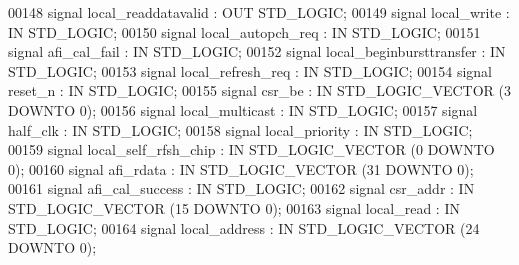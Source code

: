 \begin{DoxyCode}
00148         \textcolor{keywordflow}{signal} local\_readdatavalid : \textcolor{keywordflow}{OUT} \textcolor{comment}{STD\_LOGIC};
00149         \textcolor{keywordflow}{signal} local\_write : \textcolor{keywordflow}{IN} \textcolor{comment}{STD\_LOGIC};
00150         \textcolor{keywordflow}{signal} local\_autopch\_req : \textcolor{keywordflow}{IN} \textcolor{comment}{STD\_LOGIC};
00151         \textcolor{keywordflow}{signal} afi\_cal\_fail : \textcolor{keywordflow}{IN} \textcolor{comment}{STD\_LOGIC};
00152         \textcolor{keywordflow}{signal} local\_beginbursttransfer : \textcolor{keywordflow}{IN} \textcolor{comment}{STD\_LOGIC};
00153         \textcolor{keywordflow}{signal} local\_refresh\_req : \textcolor{keywordflow}{IN} \textcolor{comment}{STD\_LOGIC};
00154         \textcolor{keywordflow}{signal} reset\_n : \textcolor{keywordflow}{IN} \textcolor{comment}{STD\_LOGIC};
00155         \textcolor{keywordflow}{signal} csr\_be : \textcolor{keywordflow}{IN} \textcolor{comment}{STD\_LOGIC\_VECTOR} (\textcolor{vhdllogic}{}\textcolor{vhdllogic}{3} \textcolor{keywordflow}{DOWNTO} \textcolor{vhdllogic}{}\textcolor{vhdllogic}{0});
00156         \textcolor{keywordflow}{signal} local\_multicast : \textcolor{keywordflow}{IN} \textcolor{comment}{STD\_LOGIC};
00157         \textcolor{keywordflow}{signal} half\_clk : \textcolor{keywordflow}{IN} \textcolor{comment}{STD\_LOGIC};
00158         \textcolor{keywordflow}{signal} local\_priority : \textcolor{keywordflow}{IN} \textcolor{comment}{STD\_LOGIC};
00159         \textcolor{keywordflow}{signal} local\_self\_rfsh\_chip : \textcolor{keywordflow}{IN} \textcolor{comment}{STD\_LOGIC\_VECTOR} (\textcolor{vhdllogic}{}\textcolor{vhdllogic}{0} \textcolor{keywordflow}{DOWNTO} \textcolor{vhdllogic}{}\textcolor{vhdllogic}{0});
00160         \textcolor{keywordflow}{signal} afi\_rdata : \textcolor{keywordflow}{IN} \textcolor{comment}{STD\_LOGIC\_VECTOR} (\textcolor{vhdllogic}{}\textcolor{vhdllogic}{31} \textcolor{keywordflow}{DOWNTO} \textcolor{vhdllogic}{}\textcolor{vhdllogic}{0});
00161         \textcolor{keywordflow}{signal} afi\_cal\_success : \textcolor{keywordflow}{IN} \textcolor{comment}{STD\_LOGIC};
00162         \textcolor{keywordflow}{signal} csr\_addr : \textcolor{keywordflow}{IN} \textcolor{comment}{STD\_LOGIC\_VECTOR} (\textcolor{vhdllogic}{}\textcolor{vhdllogic}{15} \textcolor{keywordflow}{DOWNTO} \textcolor{vhdllogic}{}\textcolor{vhdllogic}{0});
00163         \textcolor{keywordflow}{signal} local\_read : \textcolor{keywordflow}{IN} \textcolor{comment}{STD\_LOGIC};
00164         \textcolor{keywordflow}{signal} local\_address : \textcolor{keywordflow}{IN} \textcolor{comment}{STD\_LOGIC\_VECTOR} (\textcolor{vhdllogic}{}\textcolor{vhdllogic}{24} \textcolor{keywordflow}{DOWNTO} \textcolor{vhdllogic}{}\textcolor{vhdllogic}{0});

\end{DoxyCode}
